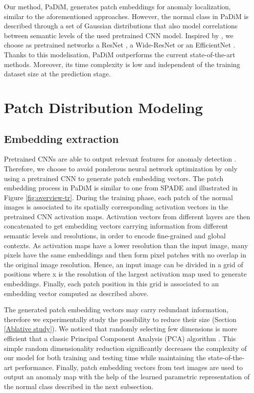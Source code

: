 \documentclass[a4paper,conference]{IEEEtran}
\begin{document}
Our method, PaDiM, generates patch embeddings for anomaly localization, similar to the aforementioned approaches. However, the normal class in PaDiM is described through a set of Gaussian distributions that also model correlations between semantic levels of the used pretrained CNN model. Inspired by \cite{cohen2020subimage,rippel2020modeling}, we choose as pretrained networks a ResNet \cite{he2015deep}, a Wide-ResNet \cite{wdr50} or an EfficientNet \cite{efficientnet}. Thanks to this modelisation, PaDiM outperforms the current state-of-the-art methods. Moreover, its time complexity is low and independent of the training dataset size at the prediction stage.

\section{Patch Distribution Modeling}


\subsection{Embedding extraction}
\label{Embeddings extraction}



Pretrained CNNs are able to output relevant features for anomaly detection \cite{bergman2020deep}. Therefore, we choose to avoid ponderous neural network optimization by only using a pretrained CNN to generate patch embedding vectors.  The patch embedding process in PaDiM is similar to one from SPADE \cite{cohen2020subimage} and illustrated in Figure \ref{fig:overview-tr}. During the training phase, each patch of the normal images is associated to its spatially corresponding activation vectors in the pretrained CNN activation maps. Activation vectors from different layers are then concatenated to get embedding vectors carrying information from different semantic levels and resolutions, in order to encode fine-grained and global contexts.  As activation maps have a lower resolution than the input image, many pixels have the same embeddings and then form pixel patches with no overlap in the original image resolution. Hence, an input image can be divided in a grid of  positions where  x is the resolution of the largest activation map used to generate embeddings. Finally, each patch position   in this grid is associated to an embedding vector  computed as described above.


The generated patch embedding vectors may carry redundant information, therefore we experimentally  study the possibility  to reduce their size  (Section \ref{Ablative study}).  We noticed that randomly selecting few dimensions is more efficient that a classic Principal Component Analysis (PCA) algorithm \cite{doi:10.1080/14786440109462720}. This simple random dimensionality reduction significantly decreases the complexity of our model for both training and testing time while maintaining the state-of-the-art performance. Finally, patch embedding vectors from test images are used to output an anomaly map with the help of the learned parametric representation of the normal class described in the next subsection.
\end{document}
